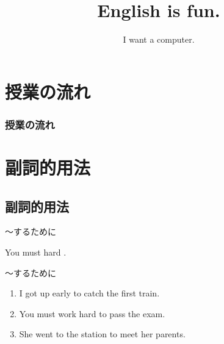 \documentclass[aspectratio=169,xcolor={dvipsnames,table}]{beamer}
\title{English is fun.}
\subtitle{I want a computer.}
\author{}
\institute[]{}
\date[]
\begin{document}
\begin{frame}[plain]
  \titlepage
\end{frame}

\section*{授業の流れ}
\begin{frame}[plain]
  \frametitle{授業の流れ}
  \tableofcontents
\end{frame}

\section{副詞的用法}
\subsection{副詞的用法}
\begin{frame}[plain]{～するために}
 \Large

You must  hard .


\end{frame}
\begin{frame}[plain]{～するために}
 \begin{enumerate}
  \item I got up early to catch the first train.
  \item You must work hard to pass the exam.
  \item She went to the station to meet her parents.
 \end{enumerate}

\end{frame}
\end{document}
